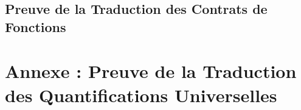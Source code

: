 



\subsection{Preuve de la Traduction des Contrats de Fonctions}















\newpage
{}
\section{Annexe : Preuve de la Traduction des Quantifications Universelles}

